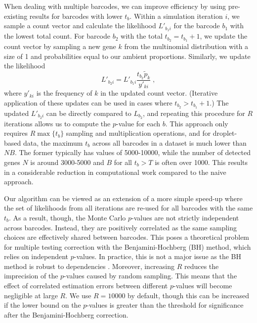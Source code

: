 \documentclass{article}
\begin{document}
When dealing with multiple barcodes, we can improve efficiency by using pre-existing results for barcodes with lower $t_b$.
Within a simulation iteration $i$, we sample a count vector and calculate the likelihood $L'_{b_1i}$ for the barcode $b_1$ with the lowest total count.
For barcode $b_2$ with the total $t_{b_2}=t_{b_1}+1$, we update the count vector by sampling a new gene $k$ from the multinomial distribution with a size of 1 and probabilities equal to our ambient proportions.
Similarly, we update the likelihood 
\[
    L'_{b_2i} = L'_{b_1i} \frac{t_{b_2} \tilde{p}_k}{y'_{ki}} \;,
\]
where $y'_{ki}$ is the frequency of $k$ in the updated count vector.
(Iterative application of these updates can be used in cases where $t_{b_2} > t_{b_1}+1$.)
The updated $L'_{b_2i}$ can be directly compared to $L_{b_2}$, and repeating this procedure for $R$ iterations allows us to compute the $p$-value for each $b$.
This approach only requires $R \max\{t_b\}$ sampling and multiplication operations, 
and for droplet-based data, the maximum $t_b$ across all barcodes in a dataset is much lower than $NB$.
The former typically has values of 5000-10000, while the number of detected genes $N$ is around 3000-5000 and $B$ for all $t_b > T$ is often over 1000.
This results in a considerable reduction in computational work compared to the naive approach.

Our algorithm can be viewed as an extension of a more simple speed-up where the set of likelihoods from all iterations are re-used for all barcodes with the same $t_b$.
As a result, though, the Monte Carlo $p$-values are not strictly independent across barcodes.
Instead, they are positively correlated as the same sampling choices are effectively shared between barcodes.
This poses a theoretical problem for multiple testing correction with the Benjamini-Hochberg (BH) method, which relies on independent $p$-values.
In practice, this is not a major issue as the BH method is robust to dependencies \cite{reiner2003identifying,kim2008effects}.
Moreover, increasing $R$ reduces the imprecision of the $p$-values caused by random sampling.
This means that the effect of correlated estimation errors between different $p$-values will become negligible at large $R$.
We use $R=10000$ by default, though this can be increased if the lower bound on the $p$-values \cite{phipson2010permutation} is greater than the threshold for significance after the Benjamini-Hochberg correction.



\end{document}
